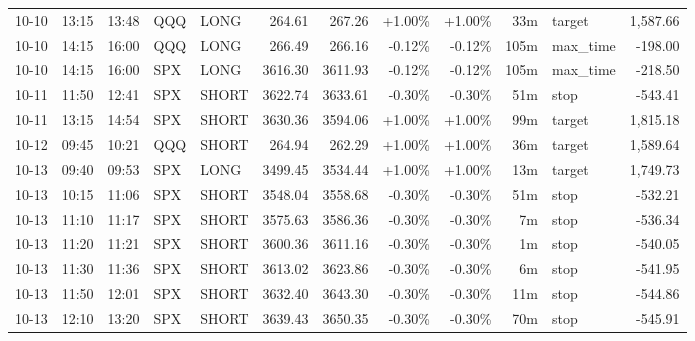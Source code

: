 \documentclass[11pt,a4paper]{article}
\begin{document}
\begin{center}
\begin{longtable}{>{\color{txtmain}}l l l l l r r r r r >{\color{txtmain}}l r}
10-10 & 13:15 & 13:48 & QQQ & LONG & 264.61 & 267.26 & \textcolor{wingreen}{+1.00\%} & \textcolor{wingreen}{+1.00\%} & 33m & target & \textcolor{wingreen}{1,587.66} \\
10-10 & 14:15 & 16:00 & QQQ & LONG & 266.49 & 266.16 & \textcolor{lossred}{-0.12\%} & \textcolor{lossred}{-0.12\%} & 105m & max\_time & \textcolor{lossred}{-198.00} \\
10-10 & 14:15 & 16:00 & SPX & LONG & 3616.30 & 3611.93 & \textcolor{lossred}{-0.12\%} & \textcolor{lossred}{-0.12\%} & 105m & max\_time & \textcolor{lossred}{-218.50} \\
10-11 & 11:50 & 12:41 & SPX & SHORT & 3622.74 & 3633.61 & \textcolor{lossred}{-0.30\%} & \textcolor{lossred}{-0.30\%} & 51m & stop & \textcolor{lossred}{-543.41} \\
10-11 & 13:15 & 14:54 & SPX & SHORT & 3630.36 & 3594.06 & \textcolor{wingreen}{+1.00\%} & \textcolor{wingreen}{+1.00\%} & 99m & target & \textcolor{wingreen}{1,815.18} \\
10-12 & 09:45 & 10:21 & QQQ & SHORT & 264.94 & 262.29 & \textcolor{wingreen}{+1.00\%} & \textcolor{wingreen}{+1.00\%} & 36m & target & \textcolor{wingreen}{1,589.64} \\
10-13 & 09:40 & 09:53 & SPX & LONG & 3499.45 & 3534.44 & \textcolor{wingreen}{+1.00\%} & \textcolor{wingreen}{+1.00\%} & 13m & target & \textcolor{wingreen}{1,749.73} \\
10-13 & 10:15 & 11:06 & SPX & SHORT & 3548.04 & 3558.68 & \textcolor{lossred}{-0.30\%} & \textcolor{lossred}{-0.30\%} & 51m & stop & \textcolor{lossred}{-532.21} \\
10-13 & 11:10 & 11:17 & SPX & SHORT & 3575.63 & 3586.36 & \textcolor{lossred}{-0.30\%} & \textcolor{lossred}{-0.30\%} & 7m & stop & \textcolor{lossred}{-536.34} \\
10-13 & 11:20 & 11:21 & SPX & SHORT & 3600.36 & 3611.16 & \textcolor{lossred}{-0.30\%} & \textcolor{lossred}{-0.30\%} & 1m & stop & \textcolor{lossred}{-540.05} \\
10-13 & 11:30 & 11:36 & SPX & SHORT & 3613.02 & 3623.86 & \textcolor{lossred}{-0.30\%} & \textcolor{lossred}{-0.30\%} & 6m & stop & \textcolor{lossred}{-541.95} \\
10-13 & 11:50 & 12:01 & SPX & SHORT & 3632.40 & 3643.30 & \textcolor{lossred}{-0.30\%} & \textcolor{lossred}{-0.30\%} & 11m & stop & \textcolor{lossred}{-544.86} \\
10-13 & 12:10 & 13:20 & SPX & SHORT & 3639.43 & 3650.35 & \textcolor{lossred}{-0.30\%} & \textcolor{lossred}{-0.30\%} & 70m & stop & \textcolor{lossred}{-545.91} \\

\end{longtable}
\end{center}
\end{document}
